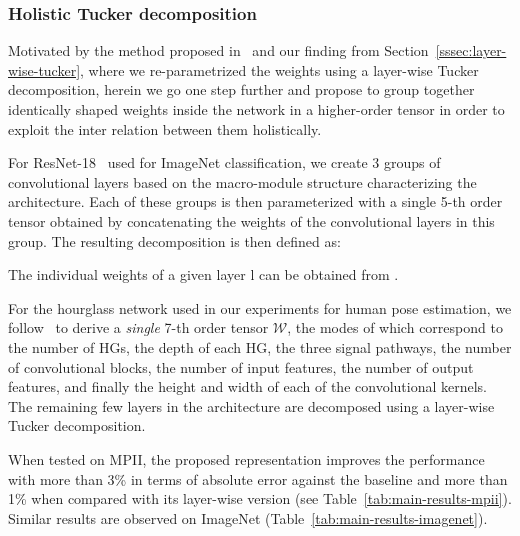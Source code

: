 \documentclass[10pt,twocolumn,letterpaper]{article}
\newcommand{\mytensor}[1]{\ensuremath{\mathcal{#1}}}
\begin{document}
\subsubsection{Holistic Tucker decomposition}\label{sssec:holistic-tucker}

Motivated by the method proposed in~\cite{kossaifi2018parametrizing} and our finding from Section~\ref{sssec:layer-wise-tucker}, where we re-parametrized the weights using a layer-wise Tucker decomposition, herein we go one step further and propose to group together identically shaped weights inside the network in a higher-order tensor in order to exploit the inter relation between them holistically. 





For ResNet-18~\cite{he2016deep} used for ImageNet classification, we create 3 groups of convolutional layers based on the macro-module structure characterizing the architecture. Each of these groups is then parameterized with a single 5-th order tensor  obtained by concatenating the weights of the  convolutional layers in this group. The resulting decomposition is then defined as:

The individual weights of a given layer l can be obtained from .

For the hourglass network used in our experiments for human pose estimation, we follow~\cite{kossaifi2018parametrizing} to derive  a \emph{single} 7-th  order tensor \mytensor{W}, the modes of which correspond to the number of HGs, the depth of each HG, the three signal pathways, the number of convolutional blocks, the number of input features, the number of output features, and finally the height and width of each of the convolutional kernels. The remaining few layers in the architecture are decomposed using a layer-wise Tucker decomposition. 

When tested on MPII, the proposed representation improves the performance with more than 3\% in terms of absolute error against the baseline and more than 1\% when compared with its layer-wise version (see Table~\ref{tab:main-results-mpii}). Similar results are observed on ImageNet (Table~\ref{tab:main-results-imagenet}).
\end{document}
